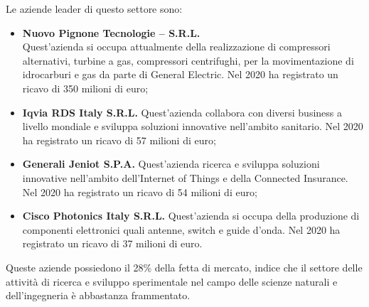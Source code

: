 Le aziende leader di questo settore sono:
\begin{itemize}
	\item \textbf{Nuovo Pignone Tecnologie – S.R.L.}\\
	Quest’azienda si occupa attualmente della realizzazione di compressori alternativi, turbine a gas, compressori centrifughi, per la movimentazione di idrocarburi e gas da parte di General Electric.
	Nel 2020 ha registrato un ricavo di 350 milioni di euro;
	
	\item \textbf{Iqvia RDS Italy S.R.L.}
	Quest’azienda collabora con diversi business a livello mondiale e sviluppa soluzioni innovative nell’ambito sanitario.
	Nel 2020 ha registrato un ricavo di 57 milioni di euro;
	
	\item \textbf{Generali Jeniot S.P.A.}
	Quest’azienda ricerca e sviluppa soluzioni innovative nell’ambito dell’Internet of Things e della Connected Insurance.
	Nel 2020 ha registrato un ricavo di 54 milioni di euro;
	
	\item \textbf{Cisco Photonics Italy S.R.L.}
	Quest’azienda si occupa della produzione di componenti elettronici quali antenne, switch e guide d’onda.
	Nel 2020 ha registrato un ricavo di 37 milioni di euro.	
\end{itemize}

Queste aziende possiedono il 28\% della fetta di mercato, indice che il settore delle attività di ricerca e sviluppo sperimentale nel campo delle scienze naturali e dell’ingegneria è abbastanza frammentato.

